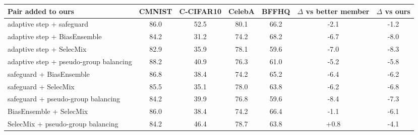 \begin{tabular}{lcccccc}
\toprule
Pair added to ours & CMNIST & C-CIFAR10 & CelebA & BFFHQ & $\Delta$ vs better member & $\Delta$ vs ours \\
\midrule
adaptive step + safeguard & 86.0 & 52.5 & 80.1 & 66.2 & -2.1 & -1.2 \\
adaptive step + BiasEnsemble & 84.2 & 31.2 & 74.2 & 68.2 & -6.7 & -8.0 \\
adaptive step + SelecMix & 82.9 & 35.9 & 78.1 & 59.6 & -7.0 & -8.3 \\
adaptive step + pseudo-group balancing & 88.2 & 40.9 & 76.3 & 61.0 & -5.2 & -5.8 \\
safeguard + BiasEnsemble & 86.8 & 38.4 & 74.2 & 65.2 & -6.4 & -6.2 \\
safeguard + SelecMix & 85.5 & 35.1 & 78.0 & 63.8 & -6.2 & -6.8 \\
safeguard + pseudo-group balancing & 84.2 & 39.9 & 76.8 & 59.6 & -8.4 & -7.3 \\
BiasEnsemble + SelecMix & 86.0 & 38.4 & 74.2 & 66.4 & -1.1 & -6.1 \\
SelecMix + pseudo-group balancing & 84.2 & 46.4 & 78.7 & 63.8 & +0.8 & -4.1 \\
\bottomrule
\end{tabular}
